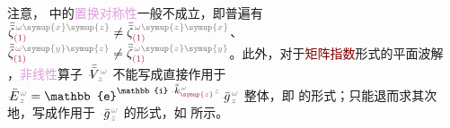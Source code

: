 注意， 中的\textcolor{Plum}{置换对称性}一般不成立，即普遍有 $\bar{\bar{\zeta}}^{\;\! \mathcolor{gray}{\omega} \mathcolor{gray}{\symup{x} \symup{z}}}_{\textcolor{Maroon}{(1)}} \neq \bar{\bar{\zeta}}^{\;\! \mathcolor{gray}{\omega} \mathcolor{gray}{\symup{z} \symup{x}}}_{\textcolor{Maroon}{(1)}}$、 $\bar{\bar{\zeta}}^{\;\! \mathcolor{gray}{\omega} \mathcolor{gray}{\symup{y} \symup{z}}}_{\textcolor{Maroon}{(1)}} \neq \bar{\bar{\zeta}}^{\;\! \mathcolor{gray}{\omega} \mathcolor{gray}{\symup{z} \symup{y}}}_{\textcolor{Maroon}{(1)}}$。此外，对于\textcolor{Maroon}{矩阵指数}形式的\textcolor{PineGreen}{平面波}解 ，\textcolor{Plum}{非线性}算子 $\xint{\mathcolor{gray}{-}}{21}{\bar{\bar{V}}}^{\;\! \mathcolor{gray}{\omega}}_{\;\! \mathcolor{gray}{z}}$ 不能写成直接作用于 $\xint{\mathcolor{gray}{-}}{25}{\bar{E}}^{\;\!\mathcolor{gray}{\omega}}_{\;\! \mathcolor{gray}{z}} = \mathbb{e}^{\mathbb{i} \xint{\begin{smallmatrix} ~ \\ {}^{}_{\mathcolor{gray}{-}} \\ ~ \end{smallmatrix}}{15}{\bar{\bar{k}}}_{\textcolor{Maroon}{\symup{z}}}^{\;\! \mathcolor{gray}{\omega}} \mathcolor{gray}{z}} \xint{{}^{}_{\mathcolor{gray}{-}}}{10}{\bar{g}}^{\;\!\mathcolor{gray}{\omega}}_{\;\! \mathcolor{gray}{z}}$ 整体，即  的形式；只能退而求其次地，写成作用于 $\xint{{}^{}_{\mathcolor{gray}{-}}}{10}{\bar{g}}^{\;\!\mathcolor{gray}{\omega}}_{\;\! \mathcolor{gray}{z}}$ 的形式，如  所示。

